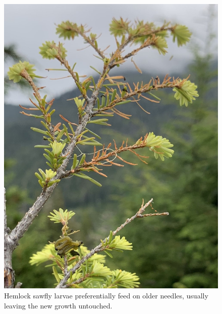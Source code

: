 \begin{multicols}{2} 

\begin{figure}[H]
\begin{center}
\vspace{2mm}
\includegraphics[width=\textwidth]{img/hemlock_sawfly_wasteful_feeder.jpg}
\caption{Hemlock sawfly larvae preferentially feed on older needles, usually leaving the new growth untouched.}
\label{hemlock_sawfly_wasteful_feeder}
\end{center}
\end{figure} 


\end{multicols}
